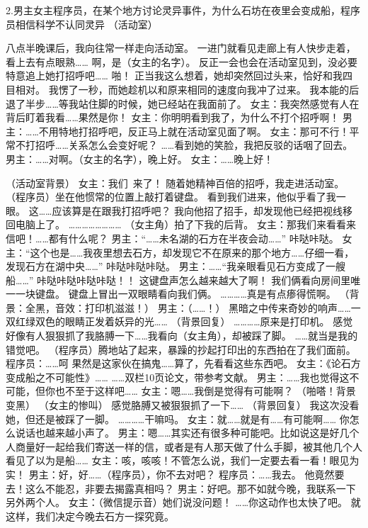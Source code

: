 \hypertarget{huodongshi}{}
2.男主女主程序员，在某个地方讨论灵异事件，为什么石坊在夜里会变成船，程序员相信科学不认同灵异
（活动室）

八点半晚课后，我向往常一样走向活动室。
一进门就看见走廊上有人快步走着，看上去有点眼熟……
啊，是（女主的名字）。
反正一会也会在活动室见到，没必要特意追上她打招呼吧……
啪！
正当我这么想着，她却突然回过头来，恰好和我四目相对。
我愣了一秒，而她趁机以和原来相同的速度向我冲了过来。
我本能的后退了半步……等我站住脚的时候，她已经站在我面前了。
女主：我突然感觉有人在背后盯着我看……果然是你！
女主：你明明看到我了，为什么不打个招呼啊！
男主：……不用特地打招呼吧，反正马上就在活动室见面了啊。
女主：那可不行！平常不打招呼……关系怎么会变好呢？
……看到她的笑脸，我把反驳的话咽了回去。
男主：……对啊。（女主的名字），晚上好。
女主：……晚上好！

（活动室背景）
女主：我们~来了！
随着她精神百倍的招呼，我走进活动室。
（程序员）坐在他惯常的位置上敲打着键盘。
看到我们进来，他似乎看了我一眼。
这……应该算是在跟我打招呼吧？
我向他招了招手，却发现他已经把视线移回电脑上了。
……………………
（女主角）拍了下我的后背。
女主：那我们来看看来信吧！……都有什么呢？
男主：“……未名湖的石方在半夜会动……”
咔哒咔哒。
女主：“这个也是……我夜里想去石方，却发现它不在原来的那个地方……仔细一看，发现石方在湖中央……”
咔哒咔哒咔哒。
男主：……“我亲眼看见石方变成了一艘船……”
咔哒咔哒咔哒咔哒！！
这键盘声怎么越来越大了啊！
我们俩看向房间里唯一一块键盘。
键盘上冒出一双眼睛看向我们俩。
…………真是有点瘆得慌啊。
（背景：全黑，音效：打印机滋滋！）
男主：（……！）
黑暗之中传来奇妙的响声……一双红绿双色的眼睛正发着妖异的光……
（背景回复）
…………原来是打印机。
感觉好像有人狠狠抓了我胳膊一下……我看向（女主角），却被踩了脚。
……就当是我的错觉吧。
（程序员）腾地站了起来，暴躁的抄起打印出的东西拍在了我们面前。
程序员：……呵
果然是这家伙在搞鬼……算了，先看看这些东西吧。
女主：《论石方变成船之不可能性》……
……双栏10页论文，带参考文献。
男主：……我也觉得这不可能，但你也不至于这样吧……
女主：嗯……我倒是觉得有可能啊？
（啪嗒！背景变黑）
（女主的惨叫）
感觉胳膊又被狠狠抓了一下……
（背景回复）
我这次没看她，但还是被踩了一脚。
…………干嘛吗。
女主：就……就是有……有可能啊……
你怎么说话也越来越小声了。
男主：嗯……其实还有很多种可能吧。比如说这是好几个人商量好一起给我们寄送一样的信，或者是有人那天做了什么手脚，被其他几个人看见了以为是船……
女主：咳，咳咳！不管怎么说，我们一定要去看一看！眼见为实！
男主：好，好……（程序员），你不去对吧？
程序员：……我去。
他竟然要去！这么不能忍，非要去揭露真相吗？
男主：好吧。那不如就今晚，我联系一下另外两个人。
女主：（微信提示音）她们说没问题！
……你这动作也太快了吧。
就这样，我们决定今晚去石方一探究竟。


